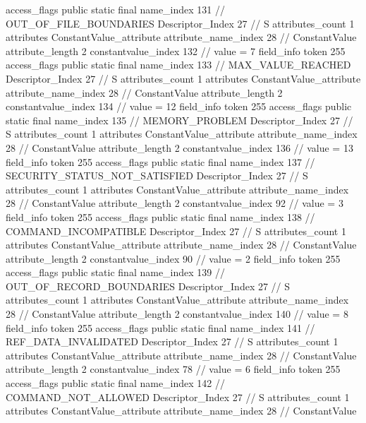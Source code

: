 {{{{{				access_flags	public static final
				name_index	131		// OUT_OF_FILE_BOUNDARIES
				Descriptor_Index	27		// S
				attributes_count	1
				attributes {
				ConstantValue_attribute {
					attribute_name_index	28		// ConstantValue
					attribute_length	2
					constantvalue_index	132		// value = 7
				}
				}
			}
			field_info {
				token	255
				access_flags	public static final
				name_index	133		// MAX_VALUE_REACHED
				Descriptor_Index	27		// S
				attributes_count	1
				attributes {
				ConstantValue_attribute {
					attribute_name_index	28		// ConstantValue
					attribute_length	2
					constantvalue_index	134		// value = 12
				}
				}
			}
			field_info {
				token	255
				access_flags	public static final
				name_index	135		// MEMORY_PROBLEM
				Descriptor_Index	27		// S
				attributes_count	1
				attributes {
				ConstantValue_attribute {
					attribute_name_index	28		// ConstantValue
					attribute_length	2
					constantvalue_index	136		// value = 13
				}
				}
			}
			field_info {
				token	255
				access_flags	public static final
				name_index	137		// SECURITY_STATUS_NOT_SATISFIED
				Descriptor_Index	27		// S
				attributes_count	1
				attributes {
				ConstantValue_attribute {
					attribute_name_index	28		// ConstantValue
					attribute_length	2
					constantvalue_index	92		// value = 3
				}
				}
			}
			field_info {
				token	255
				access_flags	public static final
				name_index	138		// COMMAND_INCOMPATIBLE
				Descriptor_Index	27		// S
				attributes_count	1
				attributes {
				ConstantValue_attribute {
					attribute_name_index	28		// ConstantValue
					attribute_length	2
					constantvalue_index	90		// value = 2
				}
				}
			}
			field_info {
				token	255
				access_flags	public static final
				name_index	139		// OUT_OF_RECORD_BOUNDARIES
				Descriptor_Index	27		// S
				attributes_count	1
				attributes {
				ConstantValue_attribute {
					attribute_name_index	28		// ConstantValue
					attribute_length	2
					constantvalue_index	140		// value = 8
				}
				}
			}
			field_info {
				token	255
				access_flags	public static final
				name_index	141		// REF_DATA_INVALIDATED
				Descriptor_Index	27		// S
				attributes_count	1
				attributes {
				ConstantValue_attribute {
					attribute_name_index	28		// ConstantValue
					attribute_length	2
					constantvalue_index	78		// value = 6
				}
				}
			}
			field_info {
				token	255
				access_flags	public static final
				name_index	142		// COMMAND_NOT_ALLOWED
				Descriptor_Index	27		// S
				attributes_count	1
				attributes {
				ConstantValue_attribute {
					attribute_name_index	28		// ConstantValue
}}}}}}}
